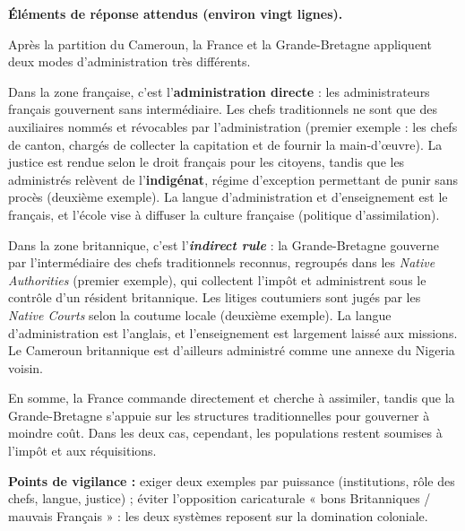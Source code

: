 \documentclass[11pt]{article}
\begin{document}
\begin{corrige}
\textbf{Éléments de réponse attendus (environ vingt lignes).}

Après la partition du Cameroun, la France et la Grande-Bretagne appliquent deux modes d'administration très différents.

Dans la zone française, c'est l'\textbf{administration directe} : les administrateurs français gouvernent sans intermédiaire. Les chefs traditionnels ne sont que des auxiliaires nommés et révocables par l'administration (premier exemple : les chefs de canton, chargés de collecter la capitation et de fournir la main-d'œuvre). La justice est rendue selon le droit français pour les citoyens, tandis que les administrés relèvent de l'\textbf{indigénat}, régime d'exception permettant de punir sans procès (deuxième exemple). La langue d'administration et d'enseignement est le français, et l'école vise à diffuser la culture française (politique d'assimilation).

Dans la zone britannique, c'est l'\textbf{\emph{indirect rule}} : la Grande-Bretagne gouverne par l'intermédiaire des chefs traditionnels reconnus, regroupés dans les \emph{Native Authorities} (premier exemple), qui collectent l'impôt et administrent sous le contrôle d'un résident britannique. Les litiges coutumiers sont jugés par les \emph{Native Courts} selon la coutume locale (deuxième exemple). La langue d'administration est l'anglais, et l'enseignement est largement laissé aux missions. Le Cameroun britannique est d'ailleurs administré comme une annexe du Nigeria voisin.

En somme, la France commande directement et cherche à assimiler, tandis que la Grande-Bretagne s'appuie sur les structures traditionnelles pour gouverner à moindre coût. Dans les deux cas, cependant, les populations restent soumises à l'impôt et aux réquisitions.

\textbf{Points de vigilance :} exiger deux exemples par puissance (institutions, rôle des chefs, langue, justice) ; éviter l'opposition caricaturale « bons Britanniques / mauvais Français » : les deux systèmes reposent sur la domination coloniale.
\end{corrige}
\end{document}
